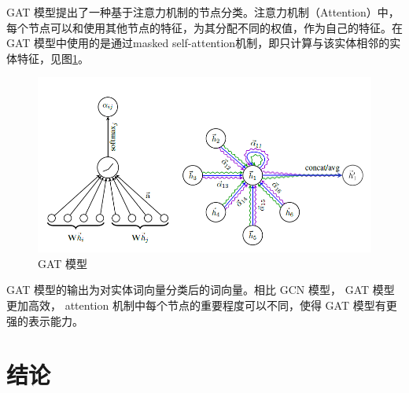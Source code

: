 \documentclass{llncs}
\begin{document}
GAT 模型\cite{DBLP:conf/iclr/VelickovicCCRLB18}提出了一种基于注意力机制的节点分类。注意力机制（Attention）\cite{DBLP:journals/corr/BahdanauCB14}中，每个节点可以和使用其他节点的特征，为其分配不同的权值，作为自己的特征。在 GAT 模型中使用的是通过masked self-attention机制，即只计算与该实体相邻的实体特征，见图\ref{fg:GAT}。
\begin{figure}
	\centering
	\includegraphics[width=0.8\columnwidth]{figures/GAT.png}
	\caption{ GAT 模型}
	\label{fg:GAT}
\end{figure}
 GAT 模型的输出为对实体词向量分类后的词向量。相比 GCN 模型\cite{DBLP:conf/iclr/KipfW17,DBLP:conf/nips/DefferrardBV16}， GAT 模型更加高效， attention 机制中每个节点的重要程度可以不同，使得 GAT 模型有更强的表示能力。

\section{结论}




%

	
\end{document}
